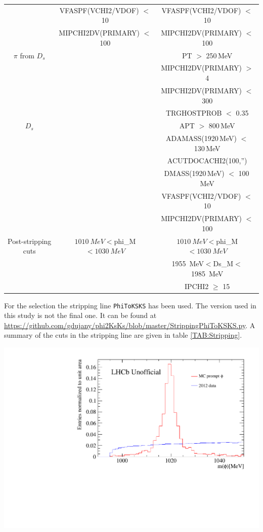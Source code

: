 \begin{center}
{\begin{tabular}{c|cc}
&VFASPF(VCHI2/VDOF) $<$ 10 & VFASPF(VCHI2/VDOF) $<$ 10\\
&MIPCHI2DV(PRIMARY) $<$ 100 & MIPCHI2DV(PRIMARY) $<$ 100\\
\hline
$\pi$ from $D_s$ &&PT $>$ 250\,MeV\\
&&MIPCHI2DV(PRIMARY) $>$ 4\\
&&MIPCHI2DV(PRIMARY) $<$ 300\\
&&TRGHOSTPROB $<$ 0.35\\
\hline
$D_s$ &&APT $>$ 800\,MeV\\
&&ADAMASS(1920\,MeV) $<$ 130\,MeV\\
&&ACUTDOCACHI2(100,'')\\
&&DMASS(1920\,MeV) $<$ 100\,MeV\\
&&VFASPF(VCHI2/VDOF) $<$ 10\\
&&MIPCHI2DV(PRIMARY) $<$ 100\\
\hline
Post-stripping cuts & $\SI{1010}{MeV}<$phi\_M$<\SI{1030}{MeV}$ &$\SI{1010}{MeV}<$phi\_M$<\SI{1030}{MeV}$\\
&&\SI{1955}{MeV}$<$Ds\_M$<$\SI{1985}{MeV}\\
&&IPCHI2 $\geq$ 15
\end{tabular} }
\label{TAB:Stripping}
\end{center}

For the selection the stripping line \verb!PhiToKSKS! has been used. The version used in this study is not the final one. It can be found at \url{https://github.com/gdujany/phi2KsKs/blob/master/StrippingPhiToKSKS.py}. A summary of the cuts in the stripping line are given in table \ref{TAB:Stripping}.





\begin{center}
\includegraphics[height = .49\textwidth]{figs/m_phi_incl.pdf}
\label{FIG:IM1}
\end{center}

